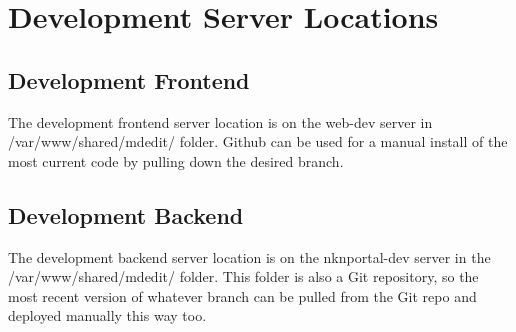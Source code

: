 \documentclass[a4paper, 12pt]{article}
\begin{document}
\section{Development Server Locations}
\subsection{Development Frontend}
\par\indent
The development frontend server location is on the web-dev server in /var/www/shared/mdedit/ folder. Github can be used for a manual install of the most current code by pulling down the desired branch. 

\subsection{Development Backend}
\par\indent
The development backend server location is on the nknportal-dev server in the /var/www/shared/mdedit/ folder. This folder is also a Git repository, so the most recent version of whatever branch can be pulled from the Git repo and deployed manually this way too.
\end{document}
